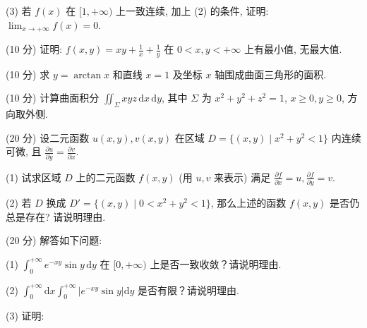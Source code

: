 (3) 若 $f(x)$ 在 $[1, +\infty)$ 上一致连续, 加上 (2) 的条件, 证明: $\lim_{x \to +\infty} f(x) = 0$.\par
(10 分) 证明: $f(x, y) = xy + \frac{1}{x} + \frac{1}{y}$ 在 $0 < x, y < +\infty$ 上有最小值, 无最大值.\par
(10 分) 求 $y = \arctan x$ 和直线 $x = 1$ 及坐标 $x$ 轴围成曲面三角形的面积.\par
(10 分) 计算曲面积分 $\iint_{\Sigma} xyz \, \mathrm{d}x \, \mathrm{d}y$, 其中 $\Sigma$ 为 $x^2 + y^2 + z^2 = 1$, $x \geq 0, y \geq 0$, 方向取外侧.\par
(20 分) 设二元函数 $u(x, y), v(x, y)$ 在区域 $D = \{(x, y) \mid x^2 + y^2 < 1\}$ 内连续可微, 且 $\frac{\partial u}{\partial y} = \frac{\partial v}{\partial x}$.\par
(1) 试求区域 $D$ 上的二元函数 $f(x, y)$ (用 $u, v$ 来表示) 满足 $\frac{\partial f}{\partial x} = u, \frac{\partial f}{\partial y} = v$.\par
(2) 若 $D$ 换成 $D' = \{(x, y) \mid 0 < x^2 + y^2 < 1\}$, 那么上述的函数 $f(x, y)$ 是否仍总是存在? 请说明理由.\par
(20 分) 解答如下问题:\par
(1) $\int_0^{+\infty} e^{-xy} \sin y \, \mathrm{d}y$ 在 $[0, +\infty)$ 上是否一致收敛？请说明理由.\par
(2) $\int_0^{+\infty}\mathrm{d}x\int_0^{+\infty}|e^{-xy}\sin y|\mathrm{d}y$ 是否有限？请说明理由.\par
(3) 证明: \par
